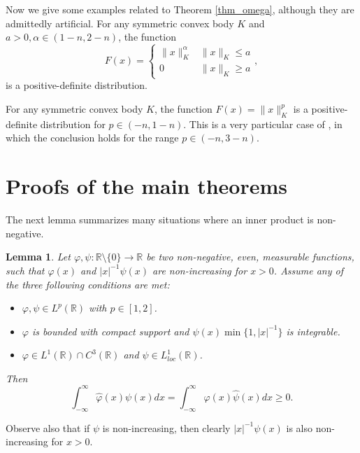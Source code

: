 \documentclass{amsart}
\newtheorem{lemma}{Lemma}
\def \R {\mathbb R}
\begin{document}
Now we give some examples related to Theorem \ref{thm_omega}, although they are admittedly artificial.
For any symmetric convex body $K$ and $a>0, \alpha \in (1-n, 2-n)$, the function
	\[
	F(x) = 
		\begin{cases}
			\|x\|_K^\alpha & \|x\|_K \leq a \\
			0 & \|x\|_K \geq a 
		\end{cases},
	\]
	is a positive-definite distribution.

For any symmetric convex body $K$, the function $F(x) = \|x\|_K^p$ is a positive-definite distribution for $p \in (-n, 1-n)$.
This is a very particular case of \cite[Theorem 3.18]{koldobsky2005fourier}, in which the conclusion holds for the range $p \in (-n, 3-n)$.

\section{Proofs of the main theorems}
The next lemma summarizes many situations where an inner product is non-negative.
\begin{lemma}
	\label{lem_decreasing_dim1}
	Let $\varphi, \psi:\R \setminus \{0\} \to \R$ be two non-negative, even, measurable functions, such that $\varphi(x)$ and $|x|^{-1} \psi(x)$ are non-increasing for $x>0$.
	Assume any of the three following conditions are met:
	\begin{itemize}
		\item $\varphi, \psi \in L^p(\R)$ with $p \in [1,2]$.
		\item $\varphi$ is bounded with compact support and $\psi(x) \min\{1, |x|^{-1}\}$ is integrable.
		\item $ \varphi \in L^1(\R) \cap C^3(\R)$ and $\psi \in L^1_{loc}(\R)$.
	\end{itemize}
	Then 
	\begin{equation}
		\label{eq_positive_product}
		\int_{-\infty}^{\infty} \hat \varphi(x) \psi(x) dx = \int_{-\infty}^{\infty} \varphi(x) \hat \psi(x) dx \geq 0.
	\end{equation}

\end{lemma}
Observe also that if $\psi$ is non-increasing, then clearly $|x|^{-1} \psi(x)$ is also non-increasing for $x>0$.
\end{document}
